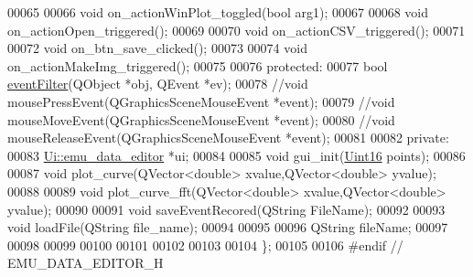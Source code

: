 \begin{DoxyCode}
00065 
00066     \textcolor{keywordtype}{void} on\_actionWinPlot\_toggled(\textcolor{keywordtype}{bool} arg1);
00067 
00068     \textcolor{keywordtype}{void} on\_actionOpen\_triggered();
00069 
00070     \textcolor{keywordtype}{void} on\_actionCSV\_triggered();
00071 
00072     \textcolor{keywordtype}{void} on\_btn\_save\_clicked();
00073 
00074     \textcolor{keywordtype}{void} on\_actionMakeImg\_triggered();
00075 
00076 \textcolor{keyword}{protected}:
00077     \textcolor{keywordtype}{bool} \hyperlink{a00004_a48f610d23d17b2679113ea351d0968e4}{eventFilter}(QObject *obj, QEvent *ev);
00078     \textcolor{comment}{//void mousePressEvent(QGraphicsSceneMouseEvent *event);}
00079     \textcolor{comment}{//void mouseMoveEvent(QGraphicsSceneMouseEvent *event);}
00080     \textcolor{comment}{//void mouseReleaseEvent(QGraphicsSceneMouseEvent *event);}
00081 
00082 \textcolor{keyword}{private}:
00083     \hyperlink{a00005}{Ui::emu\_data\_editor} *ui;
00084 
00085     \textcolor{keywordtype}{void} gui\_init(\hyperlink{a00001_aae7407b021d43f7193a81a58cfb3e297}{Uint16} points);
00086 
00087     \textcolor{keywordtype}{void} plot\_curve(QVector<double> xvalue,QVector<double> yvalue);
00088 
00089     \textcolor{keywordtype}{void} plot\_curve\_fft(QVector<double> xvalue,QVector<double> yvalue);
00090 
00091     \textcolor{keywordtype}{void} saveEventRecored(QString FileName);
00092 
00093     \textcolor{keywordtype}{void} loadFile(QString file\_name);
00094 
00095 
00096     QString fileName;
00097 
00098 
00099 
00100 
00101 
00102 
00103 
00104 \};
00105 
00106 \textcolor{preprocessor}{#endif // EMU\_DATA\_EDITOR\_H}
\end{DoxyCode}
